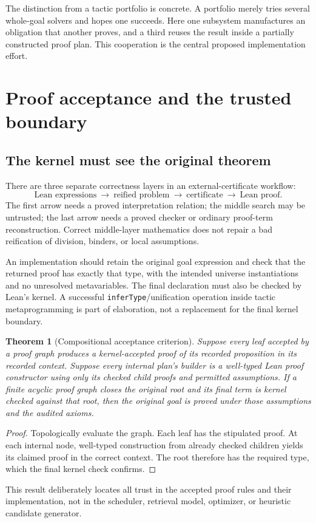 \documentclass[11pt,letterpaper]{article}
\newcommand{\code}[1]{\texttt{#1}}
\newtheorem{theorem}{Theorem}[section]
\theoremstyle{definition}\newtheorem{definition}[theorem]{Definition}
\theoremstyle{remark}\newtheorem{remark}[theorem]{Remark}
\begin{document}
The distinction from a tactic portfolio is concrete. A portfolio merely tries several whole-goal solvers and hopes one succeeds. Here one subsystem manufactures an obligation that another proves, and a third reuses the result inside a partially constructed proof plan. This cooperation is the central proposed implementation effort.

\section{Proof acceptance and the trusted boundary}
\subsection{The kernel must see the original theorem}
There are three separate correctness layers in an external-certificate workflow:
\[
 \text{Lean expressions}\ \longrightarrow\ \text{reified problem}
 \ \longrightarrow\ \text{certificate}\ \longrightarrow\ \text{Lean proof}.
\]
The first arrow needs a proved interpretation relation; the middle search may be untrusted; the last arrow needs a proved checker or ordinary proof-term reconstruction. Correct middle-layer mathematics does not repair a bad reification of division, binders, or local assumptions.

An implementation should retain the original goal expression and check that the returned proof has exactly that type, with the intended universe instantiations and no unresolved metavariables. The final declaration must also be checked by Lean's kernel. A successful \code{inferType}/unification operation inside tactic metaprogramming is part of elaboration, not a replacement for the final kernel boundary.

\begin{theorem}[Compositional acceptance criterion]
Suppose every leaf accepted by a proof graph produces a kernel-accepted proof of its recorded proposition in its recorded context. Suppose every internal plan's builder is a well-typed Lean proof constructor using only its checked child proofs and permitted assumptions. If a finite acyclic proof graph closes the original root and its final term is kernel checked against that root, then the original goal is proved under those assumptions and the audited axioms.
\end{theorem}
\begin{proof}
Topologically evaluate the graph. Each leaf has the stipulated proof. At each internal node, well-typed construction from already checked children yields its claimed proof in the correct context. The root therefore has the required type, which the final kernel check confirms.
\end{proof}
This result deliberately locates all trust in the accepted proof rules and their implementation, not in the scheduler, retrieval model, optimizer, or heuristic candidate generator.
\end{document}
